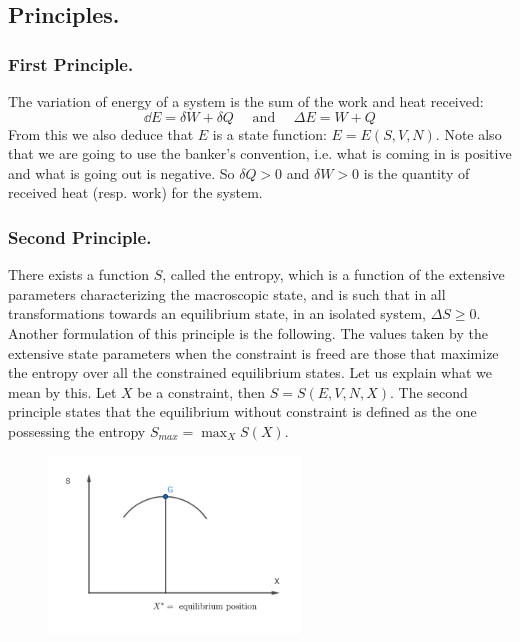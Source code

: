 \documentclass[10pt,a4paper]{book}
\begin{document}
\subsection{Principles.}
\subsubsection{First Principle.}
The variation of energy of a system is the sum of the work and heat received:
\[
\dd E = \delta W + \delta Q \quad \text{ and } \quad \Delta E = W +Q
\]
From this we also deduce that $E$ is a state function: $E = E(S, V, N)$. Note also that we are going to use the banker's convention, i.e. what is coming in is positive and what is going out is negative. So $\delta Q > 0$ and $\delta W > 0$ is the quantity of received heat (resp. work) for the system.
\subsubsection{Second Principle.}
There exists a function $S$, called the entropy, which is a function of the extensive parameters characterizing the macroscopic state, and is such that in all transformations towards an equilibrium state, in an isolated system, $\Delta S \geq 0$.\\
Another formulation of this principle is the following. The values taken by the extensive state parameters when the constraint is freed are those that maximize the entropy over all the constrained equilibrium states. Let us explain what we mean by this. Let $X$ be a constraint, then $S = S(E,V,N,X)$. The second principle states that the equilibrium without constraint is defined as the one possessing the entropy $S_{max}=\max_X S(X)$.\\

\begin{figure}[h!]
\centering
\includegraphics[width = 0.6\textwidth]{graphs/entropy_max}
\end{figure}
\end{document}
